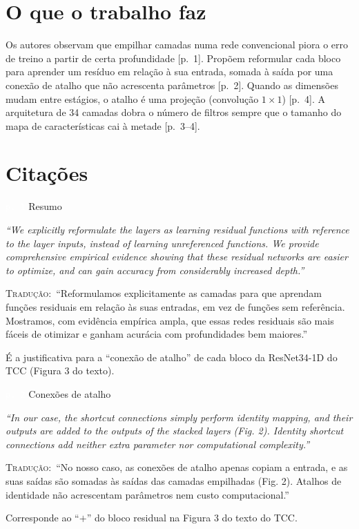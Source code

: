 \documentclass[11pt,a4paper]{article}
\newcommand{\pagechip}[1]{{\setlength{\fboxsep}{1.5pt}\colorbox{cAcc}{\textcolor{white}{\scriptsize\texttt{#1}}}}}
\newenvironment{origquote}{\par\itshape\small}{\par}
\newenvironment{tradquote}{\par\small\textsc{Tradução:}\ }{\par}
\newcommand{\explab}[1]{\par\smallskip{\small\color{cAcc}\textbf{\MakeUppercase{#1}}}\par}
\begin{document}
\section{O que o trabalho faz}
Os autores observam que empilhar camadas numa rede convencional piora o erro de treino a partir de certa profundidade [p.~1]. Propõem reformular cada bloco para aprender um resíduo em relação à sua entrada, somada à saída por uma conexão de atalho que não acrescenta parâmetros [p.~2]. Quando as dimensões mudam entre estágios, o atalho é uma projeção (convolução $1 \times 1$) [p.~4]. A arquitetura de 34 camadas dobra o número de filtros sempre que o tamanho do mapa de características cai à metade [p.~3--4].

\section{Citações}

\begin{citacard}{\pagechip{p. 1} Resumo}
\begin{origquote}“We explicitly reformulate the layers as learning residual functions with reference to the layer inputs, instead of learning unreferenced functions. We provide comprehensive empirical evidence showing that these residual networks are easier to optimize, and can gain accuracy from considerably increased depth.”\end{origquote}
\begin{tradquote}“Reformulamos explicitamente as camadas para que aprendam funções residuais em relação às suas entradas, em vez de funções sem referência. Mostramos, com evidência empírica ampla, que essas redes residuais são mais fáceis de otimizar e ganham acurácia com profundidades bem maiores.”\end{tradquote}
\explab{Explicação}
É a justificativa para a ``conexão de atalho'' de cada bloco da ResNet34-1D do TCC (Figura 3 do texto).
\end{citacard}

\begin{citacard}{\pagechip{p. 2} Conexões de atalho}
\begin{origquote}“In our case, the shortcut connections simply perform identity mapping, and their outputs are added to the outputs of the stacked layers (Fig. 2). Identity shortcut connections add neither extra parameter nor computational complexity.”\end{origquote}
\begin{tradquote}“No nosso caso, as conexões de atalho apenas copiam a entrada, e as suas saídas são somadas às saídas das camadas empilhadas (Fig. 2). Atalhos de identidade não acrescentam parâmetros nem custo computacional.”\end{tradquote}
\explab{Explicação}
Corresponde ao ``$+$'' do bloco residual na Figura 3 do texto do TCC.
\end{citacard}
\end{document}

